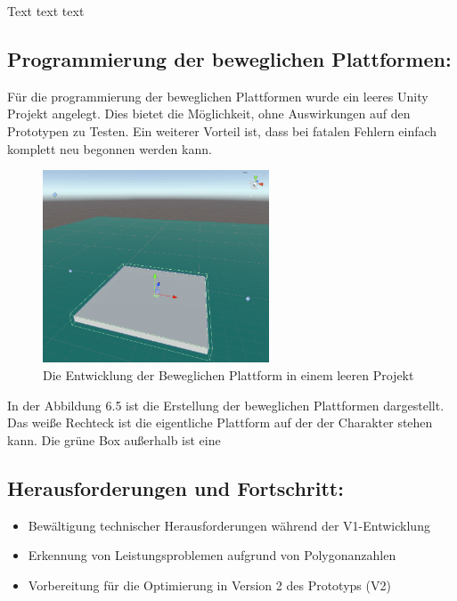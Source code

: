 Text text text

\pagebreak

\subsection{Programmierung der beweglichen Plattformen:}

Für die programmierung der beweglichen Plattformen wurde ein leeres Unity Projekt angelegt. Dies bietet die Möglichkeit, ohne Auswirkungen auf den Prototypen zu Testen. Ein weiterer Vorteil ist, dass bei fatalen Fehlern einfach komplett neu begonnen werden kann. 

\begin{figure}[h]
  \centering
  \includegraphics*[width=0.6\textwidth]{chapters/04/images/V1/MovingPlatformV1.png}
  \caption{Die Entwicklung der Beweglichen Plattform in einem leeren Projekt}
  \label{fig:PE04}
\end{figure}

In der Abbildung 6.5 ist die Erstellung der beweglichen Plattformen dargestellt. Das weiße Rechteck ist die eigentliche Plattform auf der der Charakter stehen kann. Die grüne Box außerhalb ist eine 

\subsection{Herausforderungen und Fortschritt:}
\begin{itemize}
  \item Bewältigung technischer Herausforderungen während der V1-Entwicklung
  \item Erkennung von Leistungsproblemen aufgrund von Polygonanzahlen
  \item Vorbereitung für die Optimierung in Version 2 des Prototyps (V2)
\end{itemize}


